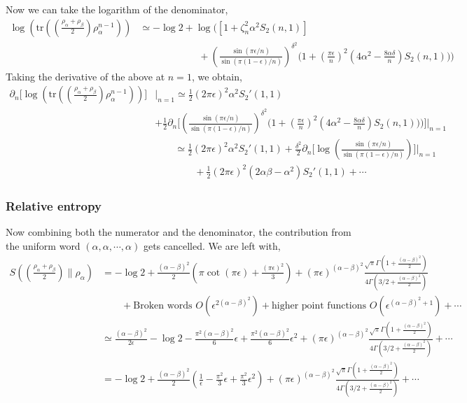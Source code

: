 \documentclass[11pt]{article}
\newcommand{\ep}{\epsilon}
\newcommand{\p}{\partial}
\newcommand{\nn}{\nonumber}
\newcommand{\lb}{\left(}
\newcommand{\rb}{\right)}
\begin{document}
Now we can take the logarithm of the denominator,
\begin{align}
    \log \lb \text{tr}\lb \lb \frac{\rho_\alpha + \rho_\beta}{2}\rb \rho_\alpha^{n-1} \rb\rb &\simeq -\log 2 + \log \Bigg( \left[1+\zeta_n^2\alpha^2 S_2(n,1)\right] \nn\\
    &\qquad \qquad \qquad +  \lb\frac{\sin(\pi\ep/n)}{\sin(\pi(1-\ep)/n)}\rb^{\delta^2}\Bigg( 1 + \lb\frac{\pi\ep}{n}\rb^2 \lb4\alpha^2 - \frac{8\alpha \delta}{n}\rb S_2(n,1)
\Bigg) \Bigg)
\end{align}
Taking the derivative of the above at $n=1$, we obtain,
\begin{align}
    \p_n \Bigg[\log \lb \text{tr}\lb \lb \frac{\rho_\alpha + \rho_\beta}{2}\rb \rho_\alpha^{n-1} \rb\rb\Bigg]&\Bigg|_{n=1} \simeq \frac{1}{2} \lb2\pi \ep\rb^2 \alpha^2 S_2'(1,1) \nn \\
    &+ \frac{1}{2}\p_n  \Bigg[\lb\frac{\sin(\pi\ep/n)}{\sin(\pi(1-\ep)/n)}\rb^{\delta^2}\Bigg( 1 + \lb\frac{\pi\ep}{n}\rb^2 \lb4\alpha^2 - \frac{8\alpha \delta}{n}\rb S_2(n,1)
\Bigg) \Bigg)\Bigg]\Bigg|_{n=1} \\ 
&\qquad \simeq  \frac{1}{2} \lb2\pi \ep\rb^2 \alpha^2 S_2'(1,1) + \frac{\delta^2}{2} \p_n \Bigg[\log \lb\frac{\sin(\pi\ep/n)}{\sin(\pi(1-\ep)/n)}\rb\Bigg]\Bigg|_{n=1} \nn\\&\qquad\qquad +  \frac{1}{2}\lb2\pi\ep\rb^2 \lb 2\alpha\beta -\alpha^2 \rb S_2'(1,1) + \cdots 
\end{align}\subsubsection{Relative entropy}
Now combining both the numerator and the denominator, the contribution from the uniform word $(\alpha,\alpha,\cdots,\alpha)$ gets cancelled. We are left with,
\begin{align}
    S\lb\lb\frac{\rho_\alpha + \rho_\beta}{2}\rb\Bigg\| \rho_\alpha\rb &= -\log 2 + \frac{(\alpha-\beta)^2}{2}\lb \pi \cot(\pi \ep) + \frac{\lb\pi\ep\rb^2}{3} \rb + \lb\pi \ep\rb^{(\alpha-\beta)^2} \frac{\sqrt \pi \Gamma\lb1+\frac{(\alpha-\beta)^2}{2}\rb}{4\Gamma\lb3/2 + \frac{(\alpha-\beta)^2}{2}\rb} \nn\\
    &\qquad +\text{Broken words }O(\ep^{2(\alpha-\beta)^2}) + \text{higher point functions  } O(\ep^{(\alpha-\beta)^2+1} )+\cdots \\
    &\simeq \frac{(\alpha-\beta)^2}{2\ep} -\log 2  - \frac{\pi^2 (\alpha-\beta)^2}{6}\ep + \frac{\pi^2 (\alpha-\beta)^2}{6}\ep^2  + \lb\pi \ep\rb^{(\alpha-\beta)^2} \frac{\sqrt \pi \Gamma\lb1+\frac{(\alpha-\beta)^2}{2}\rb}{4\Gamma\lb3/2 + \frac{(\alpha-\beta)^2}{2}\rb}
    +\cdots \\
    &= -\log 2 + \frac{(\alpha-\beta)^2}{2}\lb \frac{1}{\ep} - \frac{\pi^2}{3}\ep+ \frac{\pi^2}{3}\ep^2\rb + \lb\pi \ep\rb^{(\alpha-\beta)^2} \frac{\sqrt \pi \Gamma\lb1+\frac{(\alpha-\beta)^2}{2}\rb}{4\Gamma\lb3/2 + \frac{(\alpha-\beta)^2}{2}\rb}
    +\cdots
\end{align}
\end{document}
